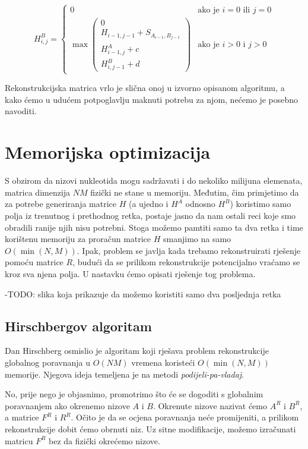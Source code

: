 \documentclass[times, utf8, zavrsni]{fer}
\begin{document}
$$
H^{B}_{i,j} =
\left\{ \begin{array}{ll}
	0 & \mbox{ako je } i=0 \mbox{ ili } j=0 \\
	\max \left( \begin{array}{l}
		0 \\
		H_{i-1,j-1} + S_{A_{i-1}, B_{j-1}} \\
		H^A_{i-1, j} + c \\
		H^B_{i, j-1} + d
	\end{array} \right) & \mbox{ako je } i>0 \mbox{ i } j>0
\end{array} \right.
$$

Rekonstrukcijska matrica vrlo je slična onoj u izvorno opisanom
algoritmu, a kako ćemo u udućem potpoglavlju maknuti potrebu za njom,
nećemo je posebno navoditi. 

\section{Memorijska optimizacija}
S obzirom da nizovi nukleotida mogu sadržavati i do nekoliko milijuna
elemenata, matrica dimenzija $N M$ fizički ne stane u memoriju. 
Međutim, čim primjetimo da za potrebe generiranja matrice $H$ (a ujedno i
$H^A$ odnosno $H^B$) koristimo
samo polja iz trenutnog i prethodnog retka, postaje jasno da nam ostali 
reci koje smo obradili ranije njih nisu potrebni. Stoga možemo pamtiti 
samo ta dva retka i time korištenu memoriju za proračun
matrice $H$ smanjimo na samo $O(\min(N, M))$. Ipak, problem se javlja
kada trebamo rekonstruirati rješenje pomoću matrice $R$, budući da
se prilikom rekonstrukcije potencijalno vraćamo se kroz sva njena polja. U
nastavku ćemo opisati rješenje tog problema.

-TODO: slika koja prikazuje da možemo koristiti samo dva posljednja retka

\subsection{Hirschbergov algoritam}
Dan Hirschberg osmislio je algoritam koji rješava problem rekonstrukcije
globalnog poravnanja u $O(NM)$ vremena koristeći $O(\min(N, M))$ memorije.
Njegova ideja temeljena je na metodi \textit{podijeli-pa-vladaj}.

No, prije nego je objasnimo, promotrimo što će se dogoditi s globalnim
poravnanjem ako okrenemo nizove $A$ i $B$. Okrenute nizove nazivat ćemo
$A^R$ i $B^R$, a matrice $F^R$ i $R^R$. Očito je da se ocjena poravnanja
neće  promijeniti, a prilikom rekonstrukcije dobit ćemo obrnuti niz. Uz sitne
modifikacije, možemo izračunati matricu $F^R$ bez da fizički okrećemo
nizove. 
\end{document}
